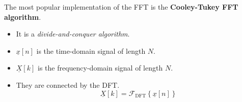 \begin{refsection}
The most popular implementation of the \ac{FFT} is the  \textbf{Cooley-Tukey \ac{FFT} algorithm}.
\begin{itemize}
	\item It is a \emph{divide-and-conquer algorithm}.
	\item $\underline{x}[n]$ is the time-domain signal of length $N$.
	\item $\underline{X}[k]$ is the frequency-domain signal of length $N$.
	\item They are connected by the \ac{DFT}.
	\begin{equation}
		\underline{X}[k] = \mathcal{F}_{\mathrm{DFT}}\left\{\underline{x}[n]\right\}
	\end{equation}
\end{itemize}


\end{refsection}
